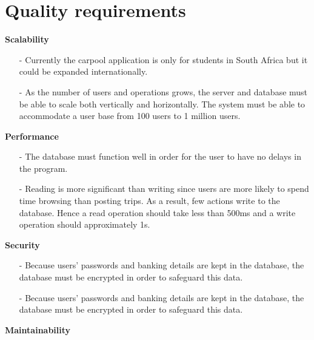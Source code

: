 \documentclass[hidelinks, 12pt, a4paper]{article}
\begin{document}
\section{Quality requirements}
\large{ \textbf{Scalability}}
\begin{itemize}
      \item[-] Currently the carpool application is only for students in South Africa but it could be expanded internationally.
      \item[-] As the number of users and operations grows, the server and database must be able to scale both vertically and horizontally.  The system must be able to accommodate a user base from 100 users to 1 million users.
\end{itemize}
\vspace{0.5cm}
\large{ \textbf{Performance}}
\begin{itemize}
      \item[-] The database must function well in order for the user to have no delays in the program.
      \item[-] Reading is more significant than writing since users are more likely to spend time browsing than posting trips. As a result, few actions write to the database. Hence a read operation should take less than 500ms and a write operation should approximately 1s.

\end{itemize}
\vspace{0.5cm}
\large{ \textbf{Security}}
\begin{itemize}
      \item[-] Because users' passwords and banking details  are kept in the database, the database must be encrypted in order to safeguard this data.
      \item [-] Because users' passwords and banking details  are kept in the database, the database must be encrypted in order to safeguard this data.
\end{itemize}
\vspace{0.5cm}
\large{ \textbf{Maintainability}}
\end{document}
